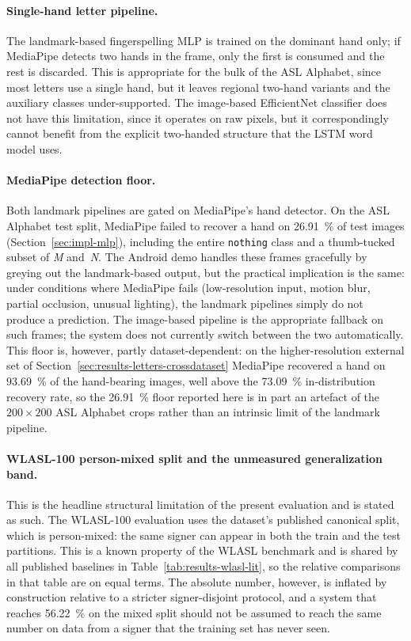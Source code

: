 \paragraph{Single-hand letter pipeline.}
The landmark-based fingerspelling MLP is trained on the dominant
hand only; if MediaPipe detects two hands in the frame, only the
first is consumed and the rest is discarded. This is appropriate
for the bulk of the ASL Alphabet, since most letters use a single
hand, but it leaves regional two-hand variants and the auxiliary
classes under-supported. The image-based EfficientNet
classifier does not have this limitation, since it operates on
raw pixels, but it correspondingly cannot benefit from the
explicit two-handed structure that the LSTM word model uses.

\paragraph{MediaPipe detection floor.}
Both landmark pipelines are gated on MediaPipe's hand detector.
On the ASL Alphabet test split, MediaPipe failed to recover a
hand on \SI{26.91}{\percent} of test images
(Section~\ref{sec:impl-mlp}), including the entire
\texttt{nothing} class and a thumb-tucked subset of \textit{M}
and~\textit{N}. The Android demo handles these frames gracefully
by greying out the landmark-based output, but the practical
implication is the same: under conditions where MediaPipe fails
(low-resolution input, motion blur, partial occlusion, unusual
lighting), the landmark pipelines simply do not produce a
prediction. The image-based pipeline is the appropriate fallback
on such frames; the system does not currently switch between the
two automatically. This floor is, however, partly dataset-dependent:
on the higher-resolution external set of
Section~\ref{sec:results-letters-crossdataset} MediaPipe recovered a
hand on \SI{93.69}{\percent} of the hand-bearing images, well above
the \SI{73.09}{\percent} in-distribution recovery rate, so the
\SI{26.91}{\percent} floor reported here is in part an artefact of the
\(200\times200\) ASL Alphabet crops rather than an intrinsic limit of
the landmark pipeline.

\paragraph{WLASL-100 person-mixed split and the unmeasured
generalization band.}
This is the headline structural limitation of the present
evaluation and is stated as such. The WLASL-100 evaluation uses
the dataset's published canonical split, which is person-mixed:
the same signer can appear in both the train and the test
partitions. This is a known property of the WLASL benchmark and
is shared by all published baselines in
Table~\ref{tab:results-wlasl-lit}, so the relative comparisons in
that table are on equal terms. The absolute number, however, is
inflated by construction relative to a stricter signer-disjoint
protocol, and a system that reaches \SI{56.22}{\percent} on the
mixed split should not be assumed to reach the same number on
data from a signer that the training set has never seen.

